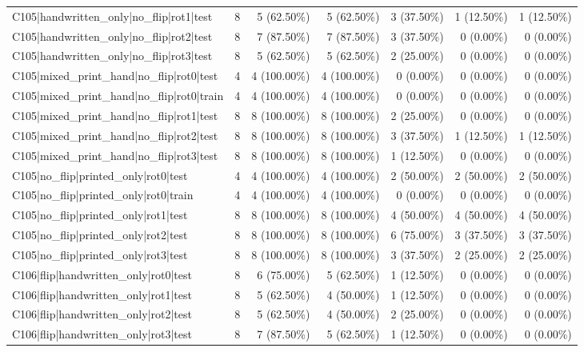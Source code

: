 \begin{longtable}{>{\raggedright\arraybackslash}p{5cm}rrrrrr}
C105|handwritten\_only|no\_flip|rot1|test & 8 & 5 (62.50\%) & 5 (62.50\%) & 3 (37.50\%) & 1 (12.50\%) & 1 (12.50\%) \\
C105|handwritten\_only|no\_flip|rot2|test & 8 & 7 (87.50\%) & 7 (87.50\%) & 3 (37.50\%) & 0 (0.00\%) & 0 (0.00\%) \\
C105|handwritten\_only|no\_flip|rot3|test & 8 & 5 (62.50\%) & 5 (62.50\%) & 2 (25.00\%) & 0 (0.00\%) & 0 (0.00\%) \\
C105|mixed\_print\_hand|no\_flip|rot0|test & 4 & 4 (100.00\%) & 4 (100.00\%) & 0 (0.00\%) & 0 (0.00\%) & 0 (0.00\%) \\
C105|mixed\_print\_hand|no\_flip|rot0|train & 4 & 4 (100.00\%) & 4 (100.00\%) & 0 (0.00\%) & 0 (0.00\%) & 0 (0.00\%) \\
C105|mixed\_print\_hand|no\_flip|rot1|test & 8 & 8 (100.00\%) & 8 (100.00\%) & 2 (25.00\%) & 0 (0.00\%) & 0 (0.00\%) \\
C105|mixed\_print\_hand|no\_flip|rot2|test & 8 & 8 (100.00\%) & 8 (100.00\%) & 3 (37.50\%) & 1 (12.50\%) & 1 (12.50\%) \\
C105|mixed\_print\_hand|no\_flip|rot3|test & 8 & 8 (100.00\%) & 8 (100.00\%) & 1 (12.50\%) & 0 (0.00\%) & 0 (0.00\%) \\
C105|no\_flip|printed\_only|rot0|test & 4 & 4 (100.00\%) & 4 (100.00\%) & 2 (50.00\%) & 2 (50.00\%) & 2 (50.00\%) \\
C105|no\_flip|printed\_only|rot0|train & 4 & 4 (100.00\%) & 4 (100.00\%) & 0 (0.00\%) & 0 (0.00\%) & 0 (0.00\%) \\
C105|no\_flip|printed\_only|rot1|test & 8 & 8 (100.00\%) & 8 (100.00\%) & 4 (50.00\%) & 4 (50.00\%) & 4 (50.00\%) \\
C105|no\_flip|printed\_only|rot2|test & 8 & 8 (100.00\%) & 8 (100.00\%) & 6 (75.00\%) & 3 (37.50\%) & 3 (37.50\%) \\
C105|no\_flip|printed\_only|rot3|test & 8 & 8 (100.00\%) & 8 (100.00\%) & 3 (37.50\%) & 2 (25.00\%) & 2 (25.00\%) \\
C106|flip|handwritten\_only|rot0|test & 8 & 6 (75.00\%) & 5 (62.50\%) & 1 (12.50\%) & 0 (0.00\%) & 0 (0.00\%) \\
C106|flip|handwritten\_only|rot1|test & 8 & 5 (62.50\%) & 4 (50.00\%) & 1 (12.50\%) & 0 (0.00\%) & 0 (0.00\%) \\
C106|flip|handwritten\_only|rot2|test & 8 & 5 (62.50\%) & 4 (50.00\%) & 2 (25.00\%) & 0 (0.00\%) & 0 (0.00\%) \\
C106|flip|handwritten\_only|rot3|test & 8 & 7 (87.50\%) & 5 (62.50\%) & 1 (12.50\%) & 0 (0.00\%) & 0 (0.00\%) \\

\end{longtable}

